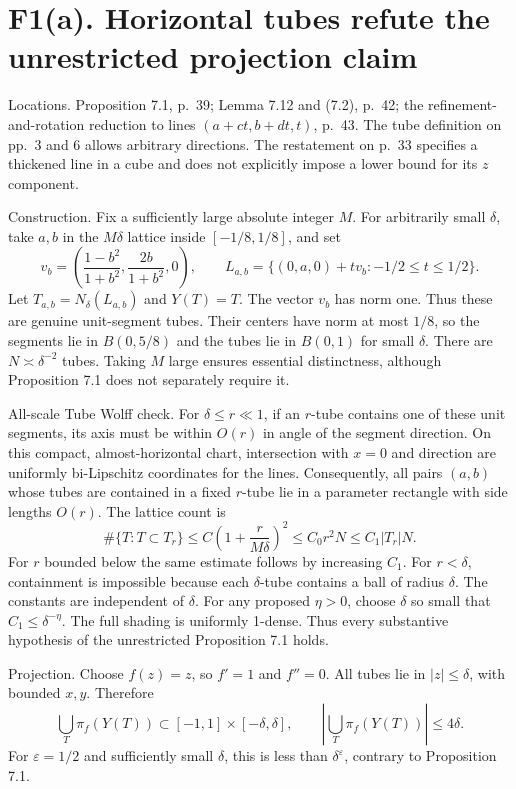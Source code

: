 \documentclass[10pt]{article}
\begin{document}
\section*{F1(a). Horizontal tubes refute the unrestricted projection claim}
Locations. Proposition 7.1, p. 39; Lemma 7.12 and (7.2), p. 42; the refinement-and-rotation reduction to lines \((a+ct,b+dt,t)\), p. 43. The tube definition on pp. 3 and 6 allows arbitrary directions. The restatement on p. 33 specifies a thickened line in a cube and does not explicitly impose a lower bound for its \(z\) component.\par
Construction. Fix a sufficiently large absolute integer \(M\). For arbitrarily small \(\delta\), take \(a,b\) in the \(M\delta\) lattice inside \([-1/8,1/8]\), and set \[v_b=\left(\frac{1-b^2}{1+b^2},\frac{2b}{1+b^2},0\right),\qquad
 L_{a,b}=\{(0,a,0)+t v_b:-1/2\leq t\leq1/2\}.\] Let \(T_{a,b}=N_\delta(L_{a,b})\) and \(Y(T)=T\). The vector \(v_b\) has norm one. Thus these are genuine unit-segment tubes. Their centers have norm at most \(1/8\), so the segments lie in \(B(0,5/8)\) and the tubes lie in \(B(0,1)\) for small \(\delta\). There are \(N\asymp\delta^{-2}\) tubes. Taking \(M\) large ensures essential distinctness, although Proposition 7.1 does not separately require it.\par
All-scale Tube Wolff check. For \(\delta\leq r\ll1\), if an \(r\)-tube contains one of these unit segments, its axis must be within \(O(r)\) in angle of the segment direction. On this compact, almost-horizontal chart, intersection with \(x=0\) and direction are uniformly bi-Lipschitz coordinates for the lines. Consequently, all pairs \((a,b)\) whose tubes are contained in a fixed \(r\)-tube lie in a parameter rectangle with side lengths \(O(r)\). The lattice count is \[\#\{T:T\subset T_r\}
 \leq C\left(1+\frac r{M\delta}\right)^2
 \leq C_0 r^2 N
 \leq C_1 |T_r|N.\] For \(r\) bounded below the same estimate follows by increasing \(C_1\). For \(r<\delta\), containment is impossible because each \(\delta\)-tube contains a ball of radius \(\delta\). The constants are independent of \(\delta\). For any proposed \(\eta>0\), choose \(\delta\) so small that \(C_1\leq\delta^{-\eta}\). The full shading is uniformly 1-dense. Thus every substantive hypothesis of the unrestricted Proposition 7.1 holds.\par
Projection. Choose \(f(z)=z\), so \(f'=1\) and \(f''=0\). All tubes lie in \(|z|\leq\delta\), with bounded \(x,y\). Therefore \[\bigcup_T\pi_f(Y(T))\subset[-1,1]\times[-\delta,\delta],
 \qquad \left|\bigcup_T\pi_f(Y(T))\right|\leq4\delta .\] For \(\varepsilon=1/2\) and sufficiently small \(\delta\), this is less than \(\delta^\varepsilon\), contrary to Proposition 7.1.\par
\end{document}

